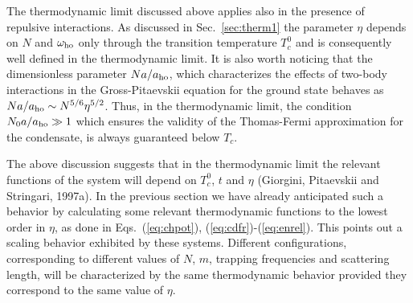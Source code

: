 The thermodynamic limit discussed above applies also in the presence
of repulsive interactions. As discussed in Sec.~\ref{sec:therm1}
the parameter $\eta$ depends on $N$ and
$\omega_{\rm ho}$ only through the transition temperature $T_c^0$  and
is consequently well defined in the
thermodynamic limit. 
It is also worth noticing that the dimensionless parameter
$Na/a_{\rm ho}$, which characterizes the effects of two-body interactions
in the Gross-Pitaevskii equation for the ground state behaves as
$Na/a_{\rm ho} \sim N^{5/6} \eta^{5/2}$.
Thus, in  the   thermodynamic limit,  the condition 
$N_0 a/a_{\rm ho}\gg 1$ which ensures the validity of the  Thomas-Fermi 
approximation for the condensate, is always guaranteed below $T_c$.

The above discussion suggests that in the thermodynamic limit the
relevant functions of the system will depend on $T_c^0$, $t$ and
$\eta$ (Giorgini, Pitaevskii and Stringari, 1997a). In the previous section
we have already anticipated  such a behavior by calculating some
relevant thermodynamic functions  to the lowest order  in $\eta$,
as done in Eqs.~(\ref{eq:chpot}), (\ref{eq:cdfr})-(\ref{eq:enrel}).
This points out a scaling behavior exhibited by these systems.
Different configurations, corresponding to different values of
$N$, $m$, trapping frequencies and scattering length, will be
characterized by the same thermodynamic behavior provided they
correspond to the same value of $\eta$.

